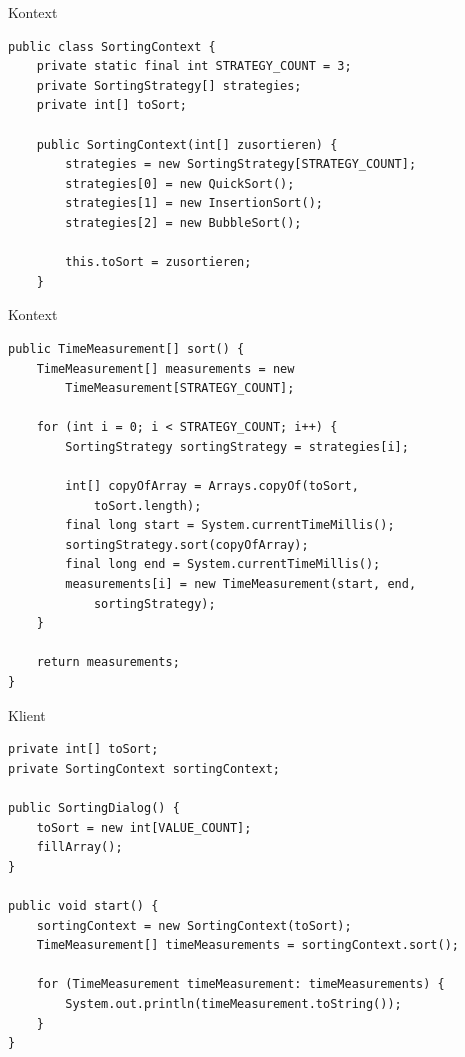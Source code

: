 \begin{frame}[fragile]{Kontext}
	\begin{exampleblock}{}
 		\begin{lstlisting}
public class SortingContext {
	private static final int STRATEGY_COUNT = 3;
	private SortingStrategy[] strategies;
	private int[] toSort;
	
	public SortingContext(int[] zusortieren) {
		strategies = new SortingStrategy[STRATEGY_COUNT];
		strategies[0] = new QuickSort();
		strategies[1] = new InsertionSort();
		strategies[2] = new BubbleSort();
		
		this.toSort = zusortieren;
	}
 		\end{lstlisting}
 	\end{exampleblock}
\end{frame}

\begin{frame}[fragile]{Kontext}
	\begin{exampleblock}{}
 		\begin{lstlisting}
public TimeMeasurement[] sort() {
    TimeMeasurement[] measurements = new 
        TimeMeasurement[STRATEGY_COUNT];
    
    for (int i = 0; i < STRATEGY_COUNT; i++) {
        SortingStrategy sortingStrategy = strategies[i];
        
        int[] copyOfArray = Arrays.copyOf(toSort, 
            toSort.length);
        final long start = System.currentTimeMillis();
        sortingStrategy.sort(copyOfArray);
        final long end = System.currentTimeMillis();
        measurements[i] = new TimeMeasurement(start, end, 
            sortingStrategy);
    }
    
    return measurements;
}
 		\end{lstlisting}
 	\end{exampleblock}
\end{frame}

\begin{frame}[fragile]{Klient}
	\begin{exampleblock}{}
 		\begin{lstlisting}
private int[] toSort;
private SortingContext sortingContext;

public SortingDialog() {
    toSort = new int[VALUE_COUNT];
    fillArray();
}

public void start() {
    sortingContext = new SortingContext(toSort);
    TimeMeasurement[] timeMeasurements = sortingContext.sort();
    
    for (TimeMeasurement timeMeasurement: timeMeasurements) {
        System.out.println(timeMeasurement.toString());
    }
}	    
 		\end{lstlisting}
 	\end{exampleblock}
\end{frame}

